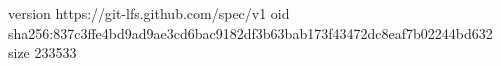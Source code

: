 version https://git-lfs.github.com/spec/v1
oid sha256:837c3ffe4bd9ad9ae3cd6bac9182df3b63bab173f43472dc8eaf7b02244bd632
size 233533
